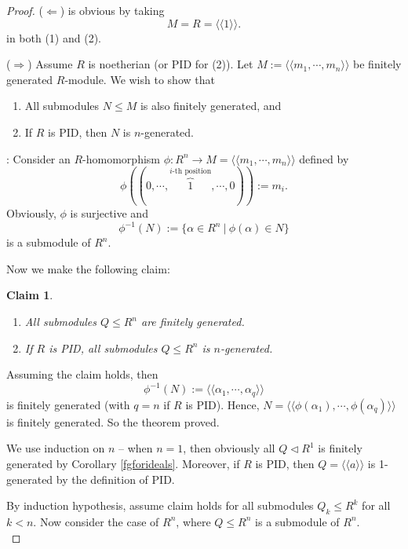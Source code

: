 \documentclass[12pt]{amsbook}
\newtheorem*{claim}{Claim}
\begin{document}
\begin{proof}
    ($\Leftarrow$) is obvious by taking
    $$M=R=\langle\langle 1\rangle\rangle.$$
    in both (1) and (2).

    \medskip
    ($\Rightarrow$) Assume $R$ is noetherian (or PID for (2)). Let $M:=\langle\langle m_1,\cdots,m_n\rangle\rangle$ be finitely generated $R$-module. We wish to show that 
    \begin{enumerate}
        \item All submodules $N\leq M$ is also finitely generated, and 
        \item If $R$ is PID, then $N$ is $n$-generated.
    \end{enumerate}
    

    : Consider an $R$-homomorphism $\phi:R^n\to M = \langle\langle m_1,\cdots,m_n\rangle\rangle$ defined by
    $$\phi((0,\cdots,\overbrace{1}^{i\text{-th position}},\cdots,0)):=m_i.$$
    Obviously, $\phi$ is surjective and
    $$\phi^{-1}(N):=\{\alpha\in R^n \ |\ \phi(\alpha)\in N\}$$
    is a submodule of $R^n$.
    
    \medskip
    Now we make the following claim:
    \begin{claim}\
        \begin{enumerate}
            \item All submodules $Q \leq R^n$ are finitely generated.
            \item If $R$ is PID, all submodules $Q\leq R^n$ is $n$-generated.
        \end{enumerate}
    \end{claim}
    Assuming the claim holds, then 
    $$\phi^{-1}(N):=\langle\langle\alpha_1,\cdots,\alpha_q\rangle\rangle$$ 
    is finitely generated (with $q=n$ if $R$ is PID). Hence, $N=\langle\langle\phi(\alpha_1),\cdots,\phi(\alpha_q)\rangle\rangle$
    is finitely generated. So the theorem proved.

    \bigskip
    We use induction on $n$ -- when $n=1$, then obviously all $Q\lhd R^1$ is finitely generated by Corollary \ref{fgforideals}. Moreover, if $R$ is PID, then $Q=\langle\langle a\rangle\rangle$ is 1-generated by the definition of PID.

    \medskip
    By induction hypothesis, assume claim holds for all submodules $Q_k\leq R^k$ for all $k<n$. Now consider the case of $R^n$, where $Q\leq R^n$ is a submodule of $R^n$. \\
    

\end{proof}
\end{document}
